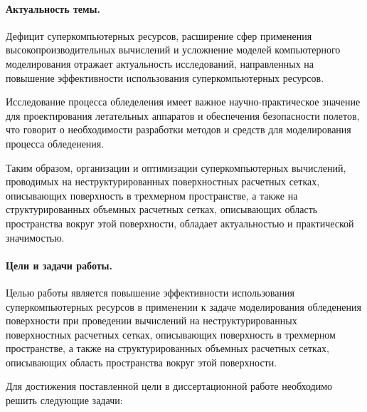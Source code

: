 \documentclass[a4paper,14pt]{extarticle}                     %
\numberwithin{equation}{section}                             %
\numberwithin{figure}{section}                               %
\numberwithin{table}{section}                                %
\theoremstyle{plain}                                         %
\numberwithin{theorem}{section}                              %
\numberwithin{lemma}{section}                                %
\numberwithin{definition}{section}                           %
\begin{document}
\paragraph{Актуальность темы.}

Дефицит суперкомпьютерных ресурсов, расширение сфер применения высокопроизводительных вычислений и усложнение моделей компьютерного моделирования отражает актуальность исследований, направленных на повышение эффективности использования суперкомпьютерных ресурсов.

Исследование процесса обледеления имеет важное научно-практическое значение для проектирования летательных аппаратов и обеспечения безопасности полетов, что говорит о необходимости разработки методов и средств для моделирования процесса обледенения.

Таким образом, организации и оптимизации суперкомпьютерных вычислений, проводимых на неструктурированных поверхностных расчетных сетках, описывающих поверхность в трехмерном пространстве, а также на структурированных объемных расчетных сетках, описывающих область пространства вокруг этой поверхности, обладает актуальностью и практической значимостью.

\paragraph{Цели и задачи работы.}

Целью работы является повышение эффективности использования суперкомпьютерных ресурсов в применении к задаче моделирования обледенения поверхности при проведении вычислений на неструктурированных поверхностных расчетных сетках, описывающих поверхность в трехмерном пространстве, а также на структурированных объемных расчетных сетках, описывающих область пространства вокруг этой поверхности.

Для достижения поставленной цели в диссертационной работе необходимо решить следующие задачи:
\end{document}
